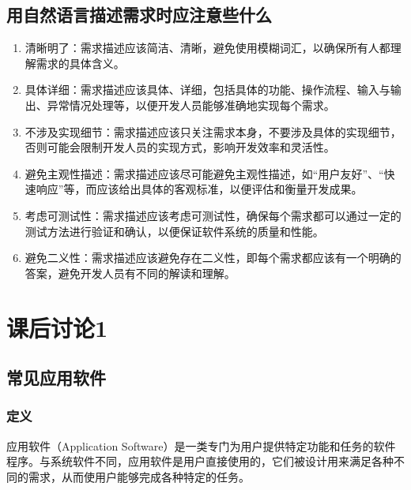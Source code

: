 \documentclass[11pt, a4paper, oneside]{ctexbook}
\begin{document}
\section{用自然语言描述需求时应注意些什么}
\begin{enumerate}
    \item 清晰明了：需求描述应该简洁、清晰，避免使用模糊词汇，以确保所有人都理解需求的具体含义。
    \item 具体详细：需求描述应该具体、详细，包括具体的功能、操作流程、输入与输出、异常情况处理等，以便开发人员能够准确地实现每个需求。
    \item 不涉及实现细节：需求描述应该只关注需求本身，不要涉及具体的实现细节，否则可能会限制开发人员的实现方式，影响开发效率和灵活性。
    \item 避免主观性描述：需求描述应该尽可能避免主观性描述，如“用户友好”、“快速响应”等，而应该给出具体的客观标准，以便评估和衡量开发成果。
    \item 考虑可测试性：需求描述应该考虑可测试性，确保每个需求都可以通过一定的测试方法进行验证和确认，以便保证软件系统的质量和性能。
    \item 避免二义性：需求描述应该避免存在二义性，即每个需求都应该有一个明确的答案，避免开发人员有不同的解读和理解。
\end{enumerate}

\chapter{课后讨论1}
\section{常见应用软件}
\subsection{定义}
应用软件（Application Software）是一类专门为用户提供特定功能和任务的软件程序。与系统软件不同，应用软件是用户直接使用的，它们被设计用来满足各种不同的需求，从而使用户能够完成各种特定的任务。
\end{document}
